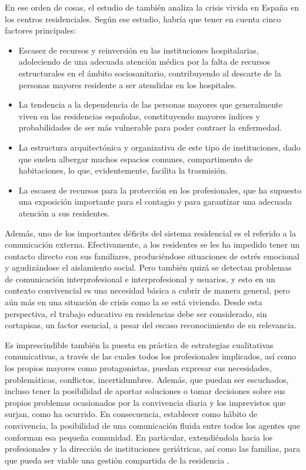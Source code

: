 \documentclass{textolivre}
\begin{document}
En ese orden de cosas, el estudio de \textcite{deusalad2020} %
también analiza la crisis vivida en España en los centros residenciales. Según ese estudio, habría que tener en cuenta cinco factores principales:

\begin{itemize}
    \item Escasez de recursos y reinversión en las instituciones hospitalarias, adoleciendo de una adecuada atención médica por la falta de recursos estructurales en el ámbito sociosanitario, contribuyendo al descarte de la personas mayores residente a ser atendidas en los hospitales.
    \item La tendencia a la dependencia de las personas mayores que generalmente viven en las residencias españolas, constituyendo mayores índices y probabilidades de ser más vulnerable para poder contraer la enfermedad.
    \item La estructura arquitectónica y organizativa de este tipo de instituciones, dado que suelen albergar muchos espacios comunes, compartimento de habitaciones, lo que, evidentemente, facilita la trasmisión.
    \item La escasez de recursos para la protección en los profesionales, que ha supuesto una exposición importante para el contagio y para garantizar una adecuada atención a sus residentes.
\end{itemize}

Además, uno de los importantes déficits del sistema residencial es el referido a la comunicación externa. Efectivamente, a los residentes se les ha impedido tener un contacto directo con sus familiares, produciéndose situaciones de estrés emocional y agudizándose el aislamiento social. Pero también quizá se detectan problemas de comunicación interprofesional e interprofesional y usuarios, y esto en un contexto convivencial es una necesidad básica a cubrir de manera general, pero aún más en una situación de crisis como la se está viviendo. Desde esta perspectiva, el trabajo educativo en residencias debe ser considerado, sin cortapisas, un factor esencial, a pesar del escaso reconocimiento de su relevancia.

Es imprescindible también la puesta en práctica de estrategias cualitativas comunicativas, a través de las cuales todos los profesionales implicados, así como los propios mayores como protagonistas, puedan expresar sus necesidades, problemáticas, conflictos, incertidumbres. Además, que puedan ser escuchados, incluso tener la posibilidad de aportar soluciones o tomar decisiones sobre sus propios problemas ocasionados por la convivencia diaria y los imprevistos que surjan, como ha ocurrido. En consecuencia, establecer como hábito de convivencia, la posibilidad de una comunicación fluida entre todos los agentes que conforman esa pequeña comunidad. En particular, extendiéndola hacia los profesionales y la dirección de instituciones geriátricas, así como las familias, para que pueda ser viable una gestión compartida de la residencia \cite{martinezdemiguel2009}. %
\end{document}
